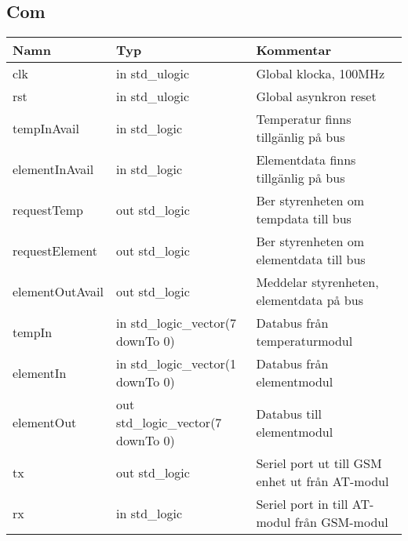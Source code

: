 \subsection{Com}
\begin{table}[H]
	\begin{tabularx}{\textwidth}{p{2cm} p{4.3cm} X}
		\hline
		\textbf{Namn} & \textbf{Typ} & \textbf{Kommentar} \\
		\hline
		clk & in std\_ulogic & Global klocka, 100MHz \\
		rst & in std\_ulogic & Global asynkron reset \\
		tempInAvail & in std\_logic & Temperatur finns tillgänlig på bus\\
		elementInAvail & in std\_logic & Elementdata finns tillgänlig på bus\\
		requestTemp & out std\_logic & Ber styrenheten om tempdata till bus\\
		requestElement & out std\_logic & Ber styrenheten om elementdata till bus\\
		elementOutAvail & out std\_logic & Meddelar styrenheten, elementdata på bus\\
		tempIn & in std\_logic\_vector(7 downTo 0) & Databus från temperaturmodul\\
		elementIn & in std\_logic\_vector(1 downTo 0) & Databus från elementmodul \\
		elementOut & out std\_logic\_vector(7 downTo 0) & Databus till elementmodul\\
		tx & out std\_logic & Seriel port ut till GSM enhet ut från AT-modul\\
		rx & in std\_logic & Seriel port in till AT-modul från GSM-modul\\		
		\hline
	\end{tabularx}
\end{table}

